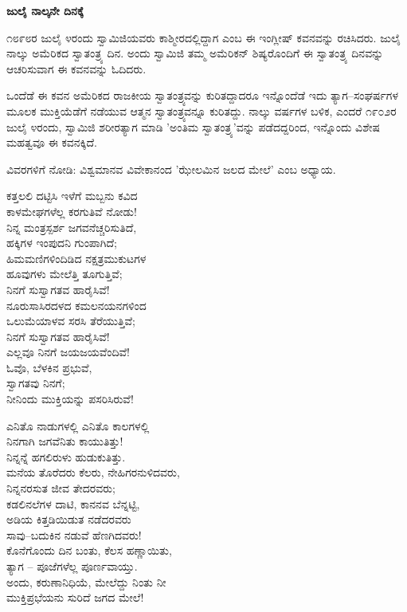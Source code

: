 \begin{center}
\textbf{ಜುಲೈ ನಾಲ್ಕನೇ ದಿನಕ್ಕೆ}
\end{center}

೧೮೯೮ರ ಜುಲೈ ೪ರಂದು ಸ್ವಾಮಿಜಿಯವರು ಕಾಶ್ಮೀರದಲ್ಲಿದ್ದಾಗ  ಎಂಬ ಈ ಇಂಗ್ಲೀಷ್ ಕವನವನ್ನು ರಚಿಸಿದರು. ಜುಲೈ ನಾಲ್ಕು ಅಮೆರಿಕದ ಸ್ವಾತಂತ್ರ್ಯ ದಿನ. ಅಂದು ಸ್ವಾಮಿಜಿ ತಮ್ಮ ಅಮೆರಿಕನ್ ಶಿಷ್ಯರೊಂದಿಗೆ ಈ ಸ್ವಾತಂತ್ರ್ಯ ದಿನವನ್ನು ಆಚರಿಸುವಾಗ ಈ ಕವನವನ್ನು ಓದಿದರು.

ಒಂದೆಡೆ ಈ ಕವನ ಅಮೆರಿಕದ ರಾಜಕೀಯ ಸ್ವಾತಂತ್ರ್ಯವನ್ನು ಕುರಿತದ್ದಾದರೂ ಇನ್ನೊಂದೆಡೆ ಇದು ತ್ಯಾಗ–ಸಂಘರ್ಷಗಳ ಮೂಲಕ ಮುಕ್ತಿಯೆಡೆಗೆ ನಡೆಯುವ ಆತ್ಮನ ಸ್ವಾತಂತ್ರ್ಯವನ್ನೂ ಕುರಿತದ್ದು. ನಾಲ್ಕು ವರ್ಷಗಳ ಬಳಿಕ, ಎಂದರೆ ೧೯೦೨ರ ಜುಲೈ ೪ರಂದು, ಸ್ವಾಮಿಜಿ ಶರೀರತ್ಯಾಗ ಮಾಡಿ 'ಅಂತಿಮ ಸ್ವಾತಂತ್ರ್ಯ'ವನ್ನು ಪಡೆದದ್ದರಿಂದ, ಇನ್ನೊಂದು ವಿಶೇಷ ಮಹತ್ವವೂ ಈ ಕವನಕ್ಕಿದೆ.

ವಿವರಗಳಿಗೆ ನೋಡಿ: ವಿಶ್ವಮಾನವ ವಿವೇಕಾನಂದ 'ಝೇಲಮಿನ ಜಲದ ಮೇಲೆ' ಎಂಬ ಅಧ್ಯಾಯ.

\begin{myquote}
ಕತ್ತಲಲಿ ದಟ್ಟಿಸಿ ಇಳೆಗೆ ಮಬ್ಬನು ಕವಿದ\\ಕಾಳಮೇಘಗಳೆಲ್ಲ ಕರಗುತಿವೆ ನೋಡು!\\ನಿನ್ನ ಮಂತ್ರಸ್ಪರ್ಶ ಜಗವನೆಚ್ಚರಿಸುತಿದೆ,\\ಹಕ್ಕಿಗಳ ಇಂಪುದನಿ ಗುಂಪಾಗಿದೆ;\\ಹಿಮಮಣಿಗಳಿಂದಿಡಿದ ನಕ್ಷತ್ರಮುಕುಟಗಳ\\ಹೂವುಗಳು ಮೇಲೆತ್ತಿ ತೂಗುತ್ತಿವೆ;\\ನಿನಗೆ ಸುಸ್ವಾಗತವ ಹಾರೈಸಿವೆ!\\ನೂರುಸಾಸಿರದಳದ ಕಮಲನಯನಗಳಿಂದ\\ಒಲುಮೆಯಾಳವ ಸರಸಿ ತೆರೆಯುತ್ತಿವೆ;\\ನಿನಗೆ ಸುಸ್ವಾಗತವ ಹಾರೈಸಿವೆ!\\ಎಲ್ಲವೂ ನಿನಗೆ ಜಯಜಯವೆಂದಿವೆ!\\ಓವೊ, ಬೆಳಕಿನ ಪ್ರಭುವೆ,\\ಸ್ವಾಗತವು ನಿನಗೆ;\\ನೀನಿಂದು ಮುಕ್ತಿಯನ್ನು ಪಸರಿಸಿರುವೆ!
\end{myquote}

\begin{myquote}
ಎನಿತೊ ನಾಡುಗಳಲ್ಲಿ ಎನಿತೊ ಕಾಲಗಳಲ್ಲಿ\\ನಿನಗಾಗಿ ಜಗವೆನಿತು ಕಾಯುತಿತ್ತು!\\ನಿನ್ನನ್ನೆ ಹಗಲಿರುಳು ಹುಡುಕುತಿತ್ತು.\\ಮನೆಯ ತೊರೆದರು ಕೆಲರು, ನೇಹಿಗರನುಳಿದವರು,\\ನಿನ್ನನರಸುತ ಜೀವ ತೇದರವರು;\\ಕಡಲಿನಲೆಗಳ ದಾಟಿ, ಕಾನನವ ಬೆನ್ನಟ್ಟಿ,\\ಅಡಿಯ ಕಿತ್ತಡಿಯಿಡುತ ನಡೆದರವರು\\ಸಾವು–ಬದುಕಿನ ನಡುವೆ ಹೆಣಗಿದವರು!\\ಕೊನೆಗೊಂದು ದಿನ ಬಂತು, ಕೆಲಸ ಹಣ್ಣಾಯಿತು,\\ತ್ಯಾಗ – ಪೂಜೆಗಳೆಲ್ಲ ಪೂರ್ಣವಾಯ್ತು.\\
ಅಂದು, ಕರುಣಾನಿಧಿಯೆ, ಮೇಲೆದ್ದು ನಿಂತು ನೀ\\ಮುಕ್ತಿಪ್ರಭೆಯನು ಸುರಿದೆ ಜಗದ ಮೇಲೆ!
\end{myquote}


